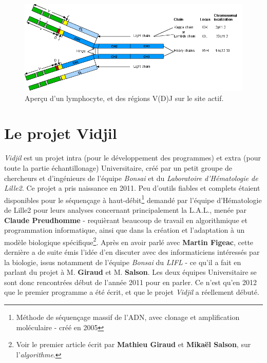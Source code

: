 \documentclass[pdftex,12pt,a4paper]{report}
\begin{document}
\begin{spacing}{1.2}
\begin{figure}[H]
\begin{center}
	\includegraphics[scale=0.37]{img/angfig1.png}
\end{center}
\caption{Aperçu d'un lymphocyte, et des régions V(D)J sur le site actif.}
\end{figure}

\section{Le projet Vidjil}

\textit{Vidjil} est un projet intra (pour le développement des programmes) et extra (pour toute la partie échantillonage) Universitaire, créé par un petit groupe de chercheurs et d'ingénieurs de l'équipe \textit{Bonsai} et du \textit{Laboratoire d'Hématologie de Lille2}.
\newline
Ce projet a pris naissance en 2011. Peu d'outils fiables et complets étaient disponibles pour le séquençage à haut-débit\footnote{Méthode de séquençage massif de l'ADN, avec clonage et amplification moléculaire - créé en 2005} demandé par l'équipe d'Hématologie de Lille2 pour leurs analyses concernant principalement la L.A.L., menée par \textbf{Claude Preudhomme} - requièrant beaucoup de travail en algorithmique et programmation informatique, ainsi que dans la création et l'adaptation à un modèle biologique spécifique\footnote{Voir le premier article écrit par \textbf{Mathieu Giraud} et \textbf{Mikaël Salson}, sur l'\textit{algorithme}.}.
Après en avoir parlé avec \textbf{Martin Figeac}, cette dernière a de suite émis l'idée d'en discuter avec des informaticiens intéressés par la biologie, issus notamment de l'équipe \textit{Bonsai} du \textit{LIFL} - ce qu'il a fait en parlant du projet à M. \textbf{Giraud} et M. \textbf{Salson}.
Les deux équipes Universitaire se sont donc rencontrées début de l'année 2011 pour en parler. Ce n'est qu'en 2012 que le premier programme a été écrit, et que le projet \textit{Vidjil} a réellement débuté.


\end{spacing}
\end{document}
